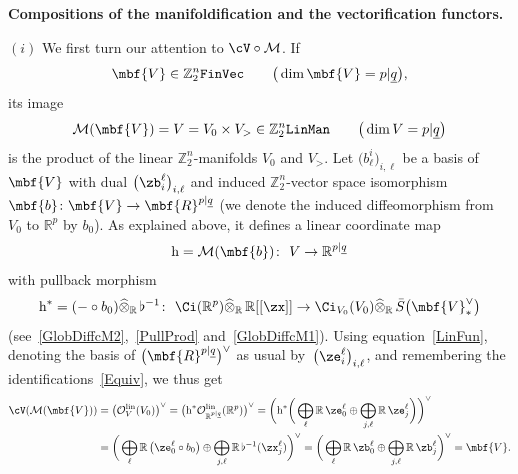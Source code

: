 \documentclass[10pt,a4paper]{amsart}
\newcommand{\rmh}{\textnormal{h}}
\newcommand{\op}[1]{\operatorname{#1}}
\newcommand{\R}{{\mathbb R}}
\newcommand{\Z}{{\mathbb Z}}
\def\ul{\underline}
\def\cM{\cal M}
\def\cO{\mathcal{O}}
\def\cM{\mathcal{M}}
\def\ul{\underline}
\newcommand{\0}{\otimes}
\newcommand{\z}{\Z_2^n}
\numberwithin{equation}{section}
\providecommand{\cal}{\mathcal}
\begin{document}
\medskip\noindent
{\bf Compositions of the manifoldification and the vectorification functors.}

\smallskip
$(i)$ We first turn our attention to $\cV\circ\cM$. If
\[
\mbf{V}\in\z{\tt FinVec}\qquad\big(\op{dim}\mbf{V}=p|\ul q\big),
\]
its image
\[
\cM(\mbf{V})=V=V_0\times V_>\in\z{\tt LinMan}\qquad\big(\op{dim}V=p|\ul q\big)
\]
is the product of the linear $\z$-manifolds $V_0$ and $V_>$. Let $\big(b^i_\ell\big)_{i,\ell}$ be a basis of $\mbf{V}$ with dual $\big(\zb_i^\ell\big)_{i,\ell}$ and induced $\z$-vector space isomorphism $\mbf{b}\colon \mbf{V}\to\mbf{R}^{p|\ul q}$ (we denote the induced diffeomorphism from $V_0$ to $\R^p$ by $b_0$). As explained above, it defines a linear coordinate map
\begin{gather}\label{LinCooMapFroBas}
\rmh=\cM(\mbf{b})\colon\ V\to\R^{p|\ul q}
\end{gather}
with pullback morphism
\[
\rmh^*=(-\circ b_0)\widehat{\0}_\R\,\flat^{-1}\colon\ \Ci(\R^p)\widehat{\0}_\R\,\R[[\zx]]\to \Ci_{V_0}(V_0)\widehat{\0}_\R\,\bar S\big(\mbf{V}^\vee_*\big)
\]
(see~\eqref{GlobDiffcM2},~\eqref{PullProd} and~\eqref{GlobDiffcM1}). Using equation~\eqref{LinFun}, denoting the basis of $\big(\mbf{R}^{p|\ul q}\big)^\vee$ as usual by~$\big(\ze_i^\ell\big)_{i,\ell}$, and remembering the identifications~\eqref{Equiv}, we thus get
\begin{align*}
\cV(\cM(\mbf{V}))&=\big(\cO_V^{\op{lin}}(V_0)\big)^\vee=\big(\rmh^*\cO_{\R^{p|\ul q}}^{\op{lin}}(\R^p)\big)^\vee=\bigg(\rmh^*\bigg(\bigoplus_\ell\R\,\ze^\ell_0\oplus\bigoplus_{j,\ell} \R\,\ze^\ell_j\bigg)\bigg)^\vee
\\
&=\bigg(\bigoplus_\ell\R\,\big(\ze^\ell_0\circ b_0\big)\oplus\bigoplus_{j,\ell}\R\,\flat^{-1}(\zx^\ell_j)\bigg)^\vee =\bigg(\bigoplus_\ell\R\,\zb^\ell_0\oplus\bigoplus_{j,\ell}\R\,\zb^\ell_j\bigg)^\vee=\mbf{V}.
\end{align*}
\end{document}
